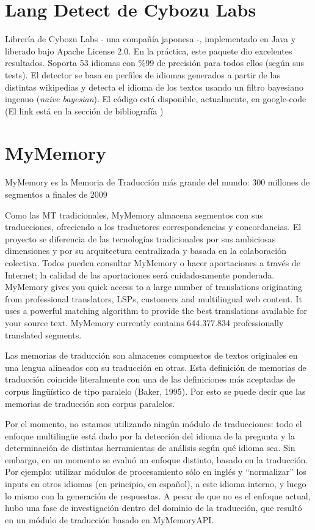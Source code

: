 \section{Lang Detect de Cybozu Labs}
\label{sec:cybozu}

Librería de Cybozu Labs - una compañía japonesa -, implementado en Java y liberado bajo Apache License 2.0. En la práctica, este paquete dio excelentes resultados. Soporta 53 idiomas con \%99 de precisión para todos ellos (según sus tests). El detector se basa en perfiles de idiomas generados a partir de las distintas wikipedias y detecta el idioma de los textos usando un filtro bayesiano ingenuo (\textit{naive bayesian}).
El código está disponible, actualmente, en google-code (El link está en la sección de bibliografía \cite{nakatani2010langdetect})

\section{MyMemory}
MyMemory es la Memoria de Traducción más grande del mundo: 300 millones de segmentos a finales de 2009

Como las MT tradicionales, MyMemory almacena segmentos con sus traducciones, ofreciendo a los traductores correspondencias y concordancias. El proyecto se diferencia de las tecnologías tradicionales por sus ambiciosas dimensiones y por su arquitectura centralizada y basada en la colaboración colectiva. Todos pueden consultar MyMemory o hacer aportaciones a través de Internet; la calidad de las aportaciones será cuidadosamente ponderada.
MyMemory gives you quick access to a large number of translations originating from professional translators, LSPs, customers and multilingual web content. It uses a powerful matching algorithm to provide the best translations available for your source text. MyMemory currently contains 644.377.834 professionally translated segments.

Las memorias de traducción son almacenes compuestos de textos originales en una lengua alineados con su traducción en otras. Esta definición de memorias de traducción coincide literalmente con una de las definiciones más aceptadas de corpus lingüístico de tipo paralelo (Baker, 1995). Por esto se puede decir que las memorias de traducción son corpus paralelos.


Por el momento, no estamos utilizando ningún módulo de traducciones:
todo el enfoque multilingüe está dado por la detección del idioma
de la pregunta y la determinación de distintas herramientas de
análisis según qué idioma sea. Sin embargo, en un momento se
evaluó un enfoque distinto, basado en la traducción. Por ejemplo:
utilizar módulos de procesamiento sólo en inglés y
{\textquotedblleft}normalizar{\textquotedblright} los inputs en otros
idiomas (en principio, en espa\~nol), a este idioma interno, y luego lo
mismo con la generación de respuestas. A pesar de que no es el
enfoque actual, hubo una fase de investigación dentro del dominio de
la traducción, que resultó en un módulo de traducción basado en
MyMemoryAPI.

